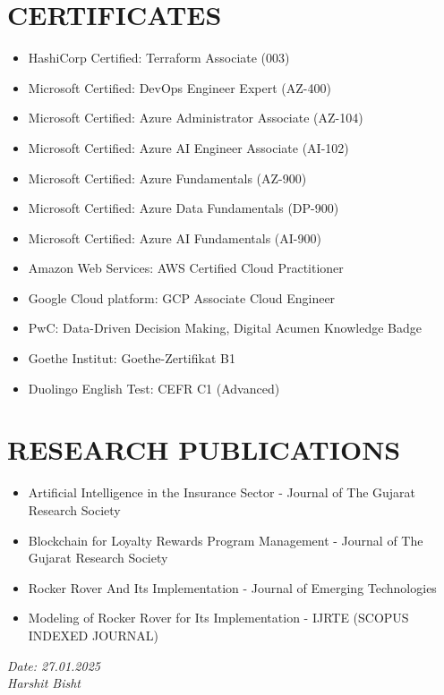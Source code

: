 \documentclass[11pt,a4paper]{article}
\begin{document}
\section*{CERTIFICATES}
\begin{itemize}
    \item HashiCorp Certified: Terraform Associate (003)
    \item Microsoft Certified: DevOps Engineer Expert (AZ-400)
    \item Microsoft Certified: Azure Administrator Associate (AZ-104)
    \item Microsoft Certified: Azure AI Engineer Associate (AI-102)
    \item Microsoft Certified: Azure Fundamentals (AZ-900)
    \item Microsoft Certified: Azure Data Fundamentals (DP-900)
    \item Microsoft Certified: Azure AI Fundamentals (AI-900)
    \item Amazon Web Services: AWS Certified Cloud Practitioner
    \item Google Cloud platform: GCP Associate Cloud Engineer
    \item PwC: Data-Driven Decision Making, Digital Acumen Knowledge Badge
    \item Goethe Institut: Goethe-Zertifikat B1
    \item Duolingo English Test: CEFR C1 (Advanced)
\end{itemize}

\section*{RESEARCH PUBLICATIONS}
\begin{itemize}
    \item Artificial Intelligence in the Insurance Sector - Journal of The Gujarat Research Society
    \item Blockchain for Loyalty Rewards Program Management - Journal of The Gujarat Research Society
    \item Rocker Rover And Its Implementation - Journal of Emerging Technologies
    \item Modeling of Rocker Rover for Its Implementation - IJRTE (SCOPUS INDEXED JOURNAL)
\end{itemize}

\vfill %
\noindent %
\begin{flushright} %
    \textit{Date: 27.01.2025}\\ %
    \textit{Harshit Bisht} %
\end{flushright}
\end{document}
